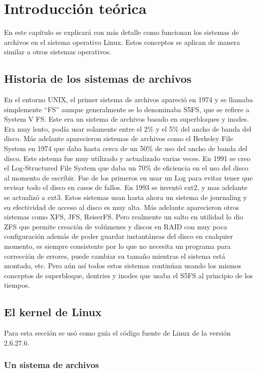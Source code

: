 \chapter{Introducción teórica}

En este capítulo se explicará con más detalle como funcionan los sistemas de archivos en el sistema operativo Linux. Estos conceptos se aplican de manera similar a otros sistemas operativos.


\section{Historia de los sistemas de archivos}

En el entorno UNIX, el primer sistema de archivos apareció en 1974 y se llamaba simplemente ``FS'' aunque generalmente se lo denominaba S5FS, que se refiere a System V FS. Este era un sistema de archivos basado en superbloques y inodes. Era muy lento, podía usar solamente entre el 2\% y el 5\% del ancho de banda del disco. Más adelante aparecieron sistemas de archivos como el Berkeley File System en 1974 que daba hasta cerca de un 50\% de uso del ancho de banda del disco. Este sistema fue muy utilizado y actualizado varias veces. En 1991 se creo el Log-Structured File System que daba un 70\% de eficiencia en el uso del disco al momento de escribir. Fue de los primeros en usar un Log para evitar tener que revisar todo el disco en casos de fallos. En 1993 se inventó ext2, y mas adelante se actualizó a ext3. Estos sistemas usan hasta ahora un sistema de journaling y su efectividad de acceso al disco es muy alta. Más adelante aparecieron otros sistemas como XFS, JFS, ReiserFS. Pero realmente un salto en utilidad lo dio ZFS que permite creación de volúmenes y discos en RAID con muy poca configuración además de poder guardar instantáneas del disco en cualquier momento, es siempre consistente por lo que no necesita un programa para corrección de errores, puede cambiar su tamaño mientras el sistema está montado, etc. Pero aún así todos estos sistemas continúan usando los mismos conceptos de superbloque, dentries y inodes que usaba el S5FS al principio de los tiempos.


\section{El kernel de Linux}

Para esta sección se usó como guía el código fuente de Linux de la versión 2.6.27.6. 

\subsection{Un sistema de archivos}

